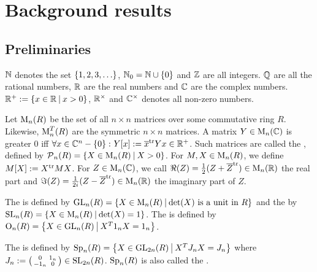 
\section{Background results}

\subsection{Preliminaries}

$\mathbb{N}$ denotes the set $\Set{1,2,3,\dots}$, $\N_0 = \N \cup \Set{0}$ and $\mathbb{Z}$ are all integers. $\mathbb{Q}$ are all the rational numbers, $\mathbb{R}$ are the real numbers and $\mathbb{C}$ are the complex numbers. $\R^+ := \Set{x\in\R}{x>0}$, $\mathbb{R}^\times$ and $\mathbb{C}^\times$ denotes all non-zero numbers.

Let $\operatorname{M}_n(R)$ be the set of all $n \times n$ matrices over some commutative ring $R$.
Likewise, $\operatorname{M}_n^T(R)$ are the symmetric $n \times n$ matrices.
A matrix $Y \in \operatorname{M}_n(\mathbb{C})$ is greater $0$ iff $\forall x \in \C^n - \Set{0} \colon Y[x] := \overline{x}^{\tr} Y x \in \R^+$. Such matrices are called the , defined by $\PM_n(R) = \Set{X \in \M_n(R)}{X > 0}$. For $M,X \in \operatorname{M}_n(R)$, we define $M[X] := X^{\textup{\textrm{tr}}} M X$. For $Z \in \operatorname{M}_n(\mathbb{C})$, we call $\Re(Z) = \frac{1}{2} (Z + \overline{Z}^{\textup{\textrm{tr}}}) \in \operatorname{M}_n(\mathbb{R})$ the real part and $\Im(Z) = \frac{1}{2i} (Z - \overline{Z}^{\textup{\textrm{tr}}})  \in \operatorname{M}_n(\mathbb{R})$ the imaginary part of $Z$.

The  is defined by $\GL_n(R) = \Set{X \in \M_n(R)}{\text{$\det(X)$ is a unit in $R$}}$
and the  by $\SL_n(R) = \Set{X \in \M_n(R)}{\det(X) = 1}$. %
The  is defined by $\Orth_n(R) = \Set{X \in \GL_n(R)}{X^T 1_n X = 1_n}$. %

The  is defined by $\Sp_n(R) = \Set{X \in \GL_{2n}(R)}{X^T J_n X = J_n}$ %
where $J_n := \left( \begin{smallmatrix} 0 & 1_n \\ -1_n & 0 \end{smallmatrix} \right) \in \operatorname{SL}_{2n}(R)$. %
$\operatorname{Sp}_n(R)$ is also called the .

